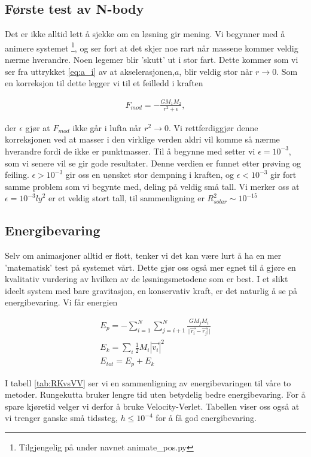 \documentclass[11pt]{article}
\begin{document}
\begin{multicols}{2}

\subsection{Første test av N-body}
\label{sec:forste-test-epsilon}
Det er ikke alltid lett å sjekke om en løsning gir mening. Vi begynner med
å animere systemet \footnote{Tilgjengelig på \cite{github-repo} under navnet
animate\_pos.py}, og ser fort at det skjer noe rart når massene kommer veldig
nærme hverandre. Noen legemer blir 'skutt' ut i stor fart. Dette kommer som
vi ser fra uttrykket \eqref{eq:a_i} av at akselerasjonen,$a$, blir veldig
stor når $r \rightarrow 0$.
Som en korreksjon til dette legger vi til et feilledd i kraften

\begin{align}
F_{mod} = -\frac{GM_1M_2}{r^2 + \epsilon},
\end{align}

der $\epsilon$ gjør at $F_{mod}$ ikke går i lufta når $r^2 \rightarrow 0$. Vi 
rettferdiggjør denne korreksjonen ved at masser i den virklige
verden aldri vil komme så nærme hverandre fordi de ikke er punktmasser.
Til å begynne med setter vi $\epsilon = 10^{-3}$, som vi senere vil se gir
gode resultater. Denne verdien er funnet etter prøving og feiling. 
$\epsilon > 10^{-3}$ gir oss en uønsket stor dempning i kraften, og 
$\epsilon < 10^{-3}$ gir fort samme problem som vi begynte med, deling på
veldig små tall. Vi merker oss at $\epsilon = 10^{-3} {ly}^2$ er et veldig 
stort tall, til sammenligning er $R_{solar}^2 \sim 10^{-15}$ 

\subsection{Energibevaring}
Selv om animasjoner alltid er flott, tenker vi det kan være lurt å ha en mer
'matematisk' test på systemet vårt. Dette gjør oss også mer egnet til
å gjøre en kvalitativ vurdering av hvilken av de løsningsmetodene som er best.
I et slikt ideelt system med bare 
gravitasjon, en konservativ kraft, er det naturlig å se på energibevaring. Vi får
energien

\begin{align}
E_{p} = - \sum_{i = 1}^{N} \sum_{j = i+1}^{N} \frac{GM_jM_i}{{||\vec{r_i} - \vec{r_j}||}} \\
E_{k} = \sum_{i} \frac{1}{2}M_i|\vec{v_i}|^2 \\
E_{tot} = E_{p} + E_{k}
\end{align}

I tabell \ref{tab:RKvsVV} ser vi en sammenligning av energibevaringen til 
våre to metoder. Rungekutta bruker lengre tid uten betydelig bedre 
energibevaring. For å spare kjøretid velger vi derfor å bruke 
Velocity-Verlet. Tabellen viser oss også at vi trenger ganske små tidssteg,
$h \leq 10 ^{-4}$ for å få god energibevaring.

\end{multicols}
\end{document}
